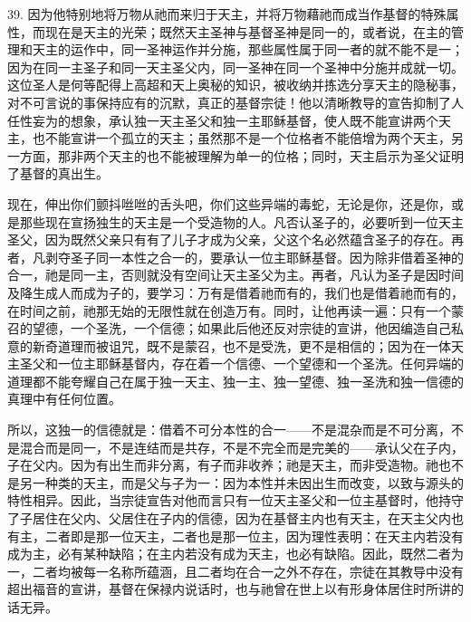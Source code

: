 39. 因为他特别地将万物从祂而来归于天主，并将万物藉祂而成当作基督的特殊属性，而现在是天主的光荣；既然天主圣神与基督圣神是同一的，或者说，在主的管理和天主的运作中，同一圣神运作并分施，那些属性属于同一者的就不能不是一；因为在同一主圣子和同一天主圣父内，同一圣神在同一个圣神中分施并成就一切。这位圣人是何等配得上高超和天上奥秘的知识，被收纳并拣选分享天主的隐秘事，对不可言说的事保持应有的沉默，真正的基督宗徒！他以清晰教导的宣告抑制了人任性妄为的想象，承认独一天主圣父和独一主耶稣基督，使人既不能宣讲两个天主，也不能宣讲一个孤立的天主；虽然那不是一个位格者不能倍增为两个天主，另一方面，那非两个天主的也不能被理解为单一的位格；同时，天主启示为圣父证明了基督的真出生。\par

现在，伸出你们颤抖咝咝的舌头吧，你们这些异端的毒蛇，无论是你，还是你，或是那些现在宣扬独生的天主是一个受造物的人。凡否认圣子的，必要听到一位天主圣父，因为既然父亲只有有了儿子才成为父亲，父这个名必然蕴含圣子的存在。再者，凡剥夺圣子同一本性之合一的，要承认一位主耶稣基督。因为除非借着圣神的合一，祂是同一主，否则就没有空间让天主圣父为主。再者，凡认为圣子是因时间及降生成人而成为子的，要学习：万有是借着祂而有的，我们也是借着祂而有的，在时间之前，祂那无始的无限性就在创造万有。同时，让他再读一遍：只有一个蒙召的望德，一个圣洗，一个信德；如果此后他还反对宗徒的宣讲，他因编造自己私意的新奇道理而被诅咒，既不是蒙召，也不是受洗，更不是相信的；因为在一体天主圣父和一位主耶稣基督内，存在着一个信德、一个望德和一个圣洗。任何异端的道理都不能夸耀自己在属于独一天主、独一主、独一望德、独一圣洗和独一信德的真理中有任何位置。\par

所以，这独一的信德就是：借着不可分本性的合一——不是混杂而是不可分离，不是混合而是同一，不是连结而是共存，不是不完全而是完美的——承认父在子内，子在父内。因为有出生而非分离，有子而非收养；祂是天主，而非受造物。祂也不是另一种类的天主，而是父与子为一：因为本性并未因出生而改变，以致与源头的特性相异。因此，当宗徒宣告对他而言只有一位天主圣父和一位主基督时，他持守了子居住在父内、父居住在子内的信德，因为在基督主内也有天主，在天主父内也有主，二者即是那一位天主，二者也是那一位主，因为理性表明：在天主内若没有成为主，必有某种缺陷；在主内若没有成为天主，也必有缺陷。因此，既然二者为一，二者均被每一名称所蕴涵，且二者均在合一之外不存在，宗徒在其教导中没有超出福音的宣讲，基督在保禄内说话时，也与祂曾在世上以有形身体居住时所讲的话无异。\par

